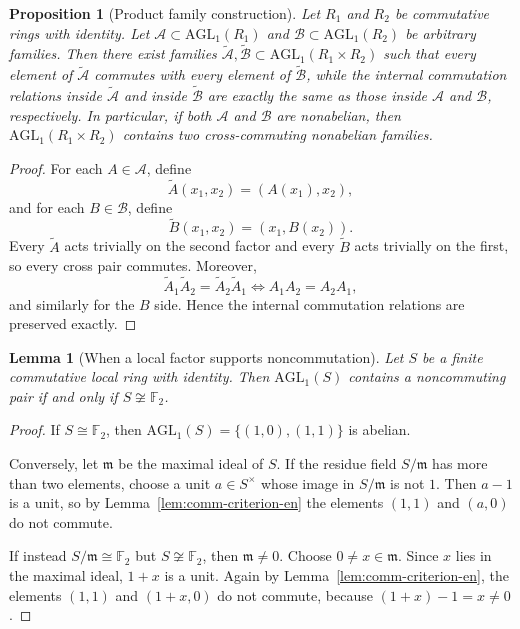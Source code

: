 \documentclass[11pt]{article}
\newcommand{\AGL}{\mathrm{AGL}_1}
\theoremstyle{uprightthm}
\newtheorem{lemma}[theorem]{Lemma}
\newtheorem{proposition}[theorem]{Proposition}
\begin{document}
\begin{proposition}[Product family construction]
\label{prop:product-family-en}
Let $R_1$ and $R_2$ be commutative rings with identity. Let
$\mathcal A\subset \AGL(R_1)$ and $\mathcal B\subset \AGL(R_2)$ be arbitrary
families. Then there exist families
$\widetilde{\mathcal A},\widetilde{\mathcal B}\subset \AGL(R_1\times R_2)$
such that every element of $\widetilde{\mathcal A}$ commutes with every
element of $\widetilde{\mathcal B}$, while the internal commutation relations
inside $\widetilde{\mathcal A}$ and inside $\widetilde{\mathcal B}$ are
exactly the same as those inside $\mathcal A$ and $\mathcal B$, respectively.
In particular, if both $\mathcal A$ and $\mathcal B$ are nonabelian, then
$\AGL(R_1\times R_2)$ contains two cross-commuting nonabelian families.
\end{proposition}

\begin{proof}
For each $A\in\mathcal A$, define
\[
\widetilde A(x_1,x_2)=(A(x_1),x_2),
\]
and for each $B\in\mathcal B$, define
\[
\widetilde B(x_1,x_2)=(x_1,B(x_2)).
\]
Every $\widetilde A$ acts trivially on the second factor and every
$\widetilde B$ acts trivially on the first, so every cross pair commutes.
Moreover,
\[
\widetilde A_1\widetilde A_2=\widetilde A_2\widetilde A_1
\iff
A_1A_2=A_2A_1,
\]
and similarly for the $B$ side. Hence the internal commutation relations are
preserved exactly.
\end{proof}

\begin{lemma}[When a local factor supports noncommutation]
\label{lem:local-noncommuting-pair-en}
Let $S$ be a finite commutative local ring with identity. Then $\AGL(S)$
contains a noncommuting pair if and only if $S\not\cong \mathbb F_2$.
\end{lemma}

\begin{proof}
If $S\cong\mathbb F_2$, then $\AGL(S)=\{(1,0),(1,1)\}$ is abelian.

Conversely, let $\mathfrak m$ be the maximal ideal of $S$. If the residue field
$S/\mathfrak m$ has more than two elements, choose a unit $a\in S^\times$ whose
image in $S/\mathfrak m$ is not $1$. Then $a-1$ is a unit, so by
Lemma~\ref{lem:comm-criterion-en} the elements $(1,1)$ and $(a,0)$ do not
commute.

If instead $S/\mathfrak m\cong \mathbb F_2$ but $S\not\cong\mathbb F_2$, then
$\mathfrak m\ne 0$. Choose $0\ne x\in\mathfrak m$. Since $x$ lies in the
maximal ideal, $1+x$ is a unit. Again by Lemma~\ref{lem:comm-criterion-en}, the
elements $(1,1)$ and $(1+x,0)$ do not commute, because $(1+x)-1=x\ne 0$.
\end{proof}
\end{document}
